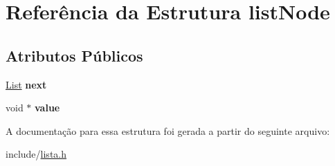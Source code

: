 \hypertarget{structlistNode}{}\section{Referência da Estrutura list\+Node}
\label{structlistNode}
\subsection*{Atributos Públicos}
\begin{DoxyCompactItemize}
\item 
\mbox{\label{structlistNode_ac8957f39101f8155faeb994dd6ae4915}} 
\hyperlink{structlistNode}{List} {\bfseries next}
\item 
\mbox{\label{structlistNode_a772dfdd1352f9a568bb567d65cb7b92a}} 
void $\ast$ {\bfseries value}
\end{DoxyCompactItemize}


A documentação para essa estrutura foi gerada a partir do seguinte arquivo\+:\begin{DoxyCompactItemize}
\item 
include/\hyperlink{lista_8h}{lista.\+h}\end{DoxyCompactItemize}
